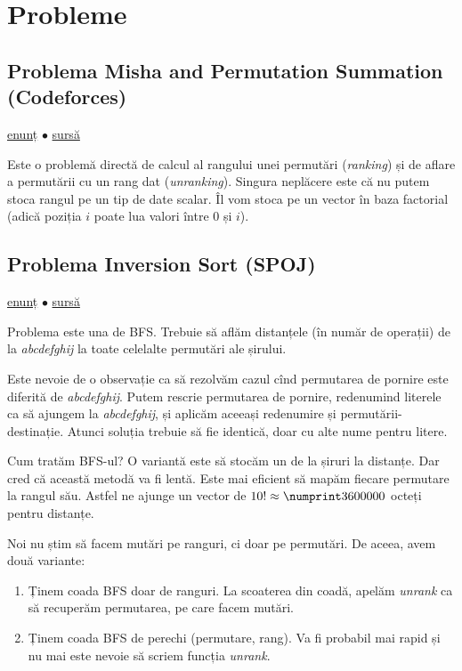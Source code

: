 \documentclass[../main.tex]{subfiles}
\begin{document}
\section{Probleme}

\subsection{Problema Misha and Permutation Summation (Codeforces)}
\label{problem:misha-and-permutation-summation}

\href{https://codeforces.com/contest/504/problem/B}{enunț}
$\bullet$
\hyperref[code:misha-and-permutation-summation]{sursă}

Este o problemă directă de calcul al rangului unei permutări (\textit{ranking}) și de aflare a permutării cu un rang dat (\textit{unranking}). Singura neplăcere este că nu putem stoca rangul pe un tip de date scalar. Îl vom stoca pe un vector în baza factorial (adică poziția $i$ poate lua valori între $0$ și $i$).

\subsection{Problema Inversion Sort (SPOJ)}
\label{problem:inversion-sort}

\href{https://www.spoj.com/problems/INVESORT/}{enunț}
$\bullet$
\hyperref[code:inversion-sort]{sursă}

Problema este una de BFS. Trebuie să aflăm distanțele (în număr de operații) de la \textit{abcdefghij} la toate celelalte permutări ale șirului.

Este nevoie de o observație ca să rezolvăm cazul cînd permutarea de pornire este diferită de \textit{abcdefghij}. Putem rescrie permutarea de pornire, redenumind literele ca să ajungem la \textit{abcdefghij}, și aplicăm aceeași redenumire și permutării-destinație. Atunci soluția trebuie să fie identică, doar cu alte nume pentru litere.

Cum tratăm BFS-ul? O variantă este să stocăm un  de la șiruri la distanțe. Dar cred că această metodă va fi lentă. Este mai eficient să mapăm fiecare permutare la rangul său. Astfel ne ajunge un vector de $10! \approx \np{3600000}$ octeți pentru distanțe.

Noi nu știm să facem mutări pe ranguri, ci doar pe permutări. De aceea, avem două variante:

\begin{enumerate}
  \item Ținem coada BFS doar de ranguri. La scoaterea din coadă, apelăm \textit{unrank} ca să recuperăm permutarea, pe care facem mutări.

  \item Ținem coada BFS de perechi (permutare, rang). Va fi probabil mai rapid și nu mai este nevoie să scriem funcția \textit{unrank}.
\end{enumerate}
\end{document}
